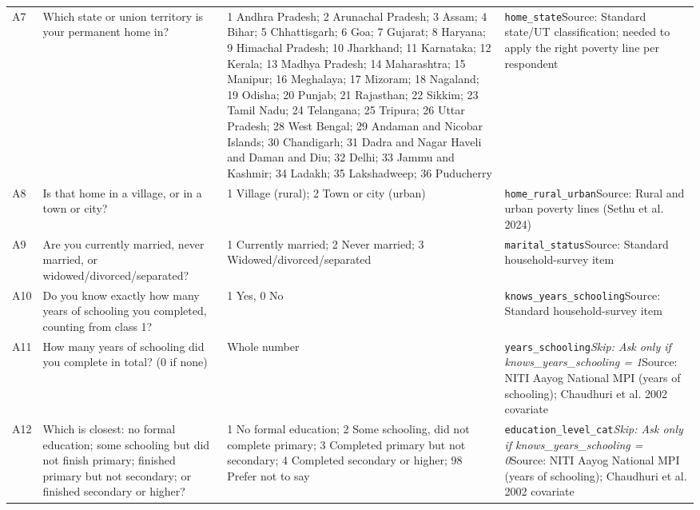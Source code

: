 \documentclass[10pt]{article}
\begin{document}
{\begin{longtable}{p{0.8cm}p{6.4cm}p{3.6cm}p{5.8cm}}
A7 & Which state or union territory is your permanent home in? & 1 Andhra Pradesh; 2 Arunachal Pradesh; 3 Assam; 4 Bihar; 5 Chhattisgarh; 6 Goa; 7 Gujarat; 8 Haryana; 9 Himachal Pradesh; 10 Jharkhand; 11 Karnataka; 12 Kerala; 13 Madhya Pradesh; 14 Maharashtra; 15 Manipur; 16 Meghalaya; 17 Mizoram; 18 Nagaland; 19 Odisha; 20 Punjab; 21 Rajasthan; 22 Sikkim; 23 Tamil Nadu; 24 Telangana; 25 Tripura; 26 Uttar Pradesh; 28 West Bengal; 29 Andaman and Nicobar Islands; 30 Chandigarh; 31 Dadra and Nagar Haveli and Daman and Diu; 32 Delhi; 33 Jammu and Kashmir; 34 Ladakh; 35 Lakshadweep; 36 Puducherry & \texttt{home\_state}\newline Source: Standard state/UT classification; needed to apply the right poverty line per respondent \\
A8 & Is that home in a village, or in a town or city? & 1 Village (rural); 2 Town or city (urban) & \texttt{home\_rural\_urban}\newline Source: Rural and urban poverty lines (Sethu et al. 2024) \\
A9 & Are you currently married, never married, or widowed/divorced/separated? & 1 Currently married; 2 Never married; 3 Widowed/divorced/separated & \texttt{marital\_status}\newline Source: Standard household-survey item \\
A10 & Do you know exactly how many years of schooling you completed, counting from class 1? & 1 Yes, 0 No & \texttt{knows\_years\_schooling}\newline Source: Standard household-survey item \\
A11 & How many years of schooling did you complete in total? (0 if none) & Whole number & \texttt{years\_schooling}\newline \textit{Skip: Ask only if knows\_years\_schooling = 1}\newline Source: NITI Aayog National MPI (years of schooling); Chaudhuri et al. 2002 covariate \\
A12 & Which is closest: no formal education; some schooling but did not finish primary; finished primary but not secondary; or finished secondary or higher? & 1 No formal education; 2 Some schooling, did not complete primary; 3 Completed primary but not secondary; 4 Completed secondary or higher; 98 Prefer not to say & \texttt{education\_level\_cat}\newline \textit{Skip: Ask only if knows\_years\_schooling = 0}\newline Source: NITI Aayog National MPI (years of schooling); Chaudhuri et al. 2002 covariate \\

\end{longtable}}
\end{document}
